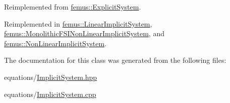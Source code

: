 Reimplemented from \mbox{\hyperlink{classfemus_1_1_explicit_system_a91f61bd0aa02102fe9af817da96be72b}{femus\+::\+Explicit\+System}}.



Reimplemented in \mbox{\hyperlink{classfemus_1_1_linear_implicit_system_a45df3966aab87bd06da49c78897a6648}{femus\+::\+Linear\+Implicit\+System}}, \mbox{\hyperlink{classfemus_1_1_monolithic_f_s_i_non_linear_implicit_system_a29bb0bdaf1eec888af05e8e57469faf4}{femus\+::\+Monolithic\+F\+S\+I\+Non\+Linear\+Implicit\+System}}, and \mbox{\hyperlink{classfemus_1_1_non_linear_implicit_system_a8f4727b8b763bdac9f58b4c9dbb097be}{femus\+::\+Non\+Linear\+Implicit\+System}}.



The documentation for this class was generated from the following files\+:\begin{DoxyCompactItemize}
\item 
equations/\mbox{\hyperlink{_implicit_system_8hpp}{Implicit\+System.\+hpp}}\item 
equations/\mbox{\hyperlink{_implicit_system_8cpp}{Implicit\+System.\+cpp}}\end{DoxyCompactItemize}
